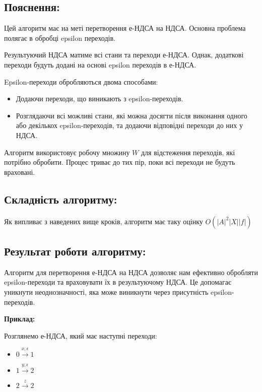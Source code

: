 \documentclass[12pt,a4paper]{article}
\begin{document}
\newpage

\subsection*{Пояснення:}

Цей алгоритм має на меті перетворення е-НДСА на НДСА. Основна проблема полягає в обробці epsilon переходів.

\vspace{0.5em}
Результуючий НДСА матиме всі стани та переходи е-НДСА. Однак, додаткові переходи будуть додані на основі epsilon переходів в е-НДСА.
\vspace{0.5em}

Epsilon-переходи обробляються двома способами:
\begin{itemize}
    \item Додаючи переходи, що виникають з epsilon-переходів.
    \item Розглядаючи всі можливі стани, які можна досягти після виконання одного або декількох epsilon-переходів, та додаючи відповідні переходи до них у НДСА.
\end{itemize}

Алгоритм використовує робочу множину \( W \) для відстеження переходів, які потрібно обробити. Процес триває до тих пір, поки всі переходи не будуть враховані.

\subsection*{Складність алгоритму:}
Як випливає з наведених вище кроків, алгоритм має таку оцінку \( O(|A|^2|X||f|) \)

\subsection*{Результат роботи алгоритму:}

Алгоритм для перетворення е-НДСА на НДСА дозволяє нам ефективно обробляти epsilon-переходи та враховувати їх в результуючому НДСА. Це допомагає уникнути неоднозначності, яка може виникнути через присутність epsilon-переходів.

\vspace{1em}
\textbf{Приклад:}
\vspace{0.5em}

Розглянемо е-НДСА, який має наступні переходи:
\begin{itemize}
    \item \(0 \xrightarrow{x, \epsilon} 1\)
    \item \(1 \xrightarrow{y, \epsilon} 2\)
    \item \(2 \xrightarrow{z} 2\)
\end{itemize}
\end{document}
